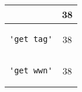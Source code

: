 \begin{table*}
\begin{center}
\begin{tabular}{lc}
& 38 \\ 
\midrule
\begin{minipage}{2.3in}
\begin{verbatim}
'get_tag'\end{verbatim}
\end{minipage}
& 38 \\ 
\midrule
\begin{minipage}{2.3in}
\begin{verbatim}
'get_wwn'\end{verbatim}
\end{minipage}
& 38 \\ 
\bottomrule
\end{tabular}
\end{center}
\end{table*}

